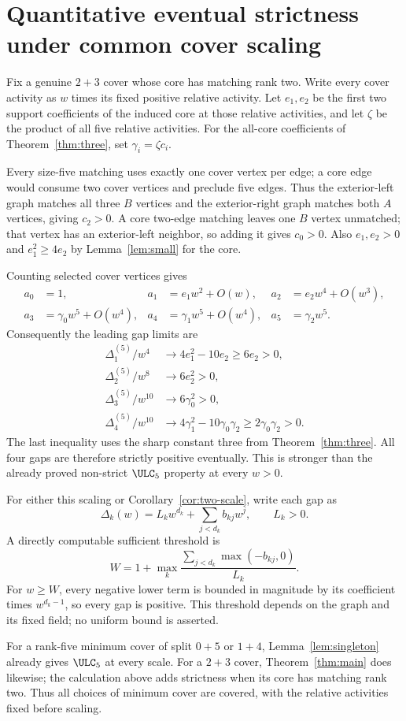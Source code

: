 \section{Quantitative eventual strictness under common cover scaling}\label{sec:scaling}
Fix a genuine $2+3$ cover whose core has matching rank two. Write every cover activity as $w$ times its fixed positive relative activity. Let $e_1,e_2$ be the first two support coefficients of the induced core at those relative activities, and let $\zeta$ be the product of all five relative activities. For the all-core coefficients of Theorem~\ref{thm:three}, set $\gamma_i=\zeta c_i$.

Every size-five matching uses exactly one cover vertex per edge; a core edge would consume two cover vertices and preclude five edges. Thus the exterior-left graph matches all three $B$ vertices and the exterior-right graph matches both $A$ vertices, giving $c_2>0$. A core two-edge matching leaves one $B$ vertex unmatched; that vertex has an exterior-left neighbor, so adding it gives $c_0>0$. Also $e_1,e_2>0$ and $e_1^2\ge4e_2$ by Lemma~\ref{lem:small} for the core.

Counting selected cover vertices gives
\begin{align*}
 a_0&=1,&a_1&=e_1w^2+O(w),&a_2&=e_2w^4+O(w^3),\\
 a_3&=\gamma_0w^5+O(w^4),&a_4&=\gamma_1w^5+O(w^4),&a_5&=\gamma_2w^5.
\end{align*}
Consequently the leading gap limits are
\begin{align*}
 \Delta_1^{(5)}/w^4&\longrightarrow4e_1^2-10e_2\ge6e_2>0,\\
 \Delta_2^{(5)}/w^8&\longrightarrow6e_2^2>0,\\
 \Delta_3^{(5)}/w^{10}&\longrightarrow6\gamma_0^2>0,\\
 \Delta_4^{(5)}/w^{10}&\longrightarrow4\gamma_1^2-10\gamma_0\gamma_2
 \ge2\gamma_0\gamma_2>0.
\end{align*}
The last inequality uses the sharp constant three from Theorem~\ref{thm:three}. All four gaps are therefore strictly positive eventually. This is stronger than the already proved non-strict $\ULC_5$ property at every $w>0$.

For either this scaling or Corollary~\ref{cor:two-scale}, write each gap as
\[
 \Delta_k(w)=L_kw^{d_k}+\sum_{j<d_k}b_{kj}w^j,\qquad L_k>0.
\]
A directly computable sufficient threshold is
\begin{equation}\label{eq:positivethreshold}
 W=1+\max_k\frac{\sum_{j<d_k}\max(-b_{kj},0)}{L_k}.
\end{equation}
For $w\ge W$, every negative lower term is bounded in magnitude by its coefficient times $w^{d_k-1}$, so every gap is positive. This threshold depends on the graph and its fixed field; no uniform bound is asserted.

For a rank-five minimum cover of split $0+5$ or $1+4$, Lemma~\ref{lem:singleton} already gives $\ULC_5$ at every scale. For a $2+3$ cover, Theorem~\ref{thm:main} does likewise; the calculation above adds strictness when its core has matching rank two. Thus all choices of minimum cover are covered, with the relative activities fixed before scaling.
